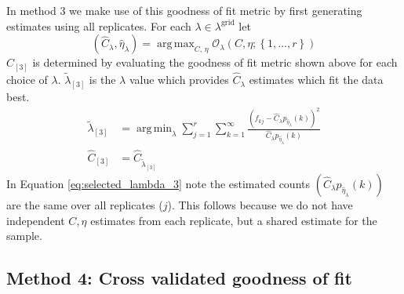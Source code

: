 \documentclass[oupdraft]{bio}
\DeclareMathOperator*{\argmin}{arg\,min}
\DeclareMathOperator*{\argmax}{arg\,max}
\newcommand{\lambdagrid}{\lambda^{\text{grid}}}
\begin{document}
In method 3 we make use of this goodness of fit metric by first generating estimates using all replicates.  For each $\lambda \in \lambdagrid$ let
\begin{equation}
\left(\widehat{C}_{\lambda}, \widehat{\eta}_{\lambda} \right) = \argmax_{C, \, \eta} \mathcal{O}_\lambda \left(C, \eta; \left\{1, \dots, r \right\} \right) \label{eq:c_hat_lambdas_method_3}
\end{equation}
$\widehat{C}_{[3]}$ is determined by evaluating the goodness of fit metric shown above for each choice of $\lambda$.  $\widetilde{\lambda}_{[3]}$ is the $\lambda$ value which provides $\widehat{C}_{\lambda}$ estimates which fit the data best.
\begin{align}
\widetilde{\lambda}_{[3]} &= \argmin_{\lambda} \sum_{j=1}^r \sum_{k=1}^{\infty} \frac{ \left( f_{kj} - \widehat{C}_{\lambda} p_{\widehat{\eta}_{\lambda}}(k) \right)^2}{\widehat{C}_{\lambda}p_{\widehat{\eta}_{\lambda}}(k)} \label{eq:selected_lambda_3} \\
\widehat{C}_{[3]} &= \widehat{C}_{\widetilde{\lambda}_{[3]}}
\end{align}
In Equation \ref{eq:selected_lambda_3} note the estimated counts $\left( \widehat{C}_{\lambda} p_{\widehat{\eta}_{\lambda}}(k) \right)$ are the same over all replicates ($j$).  This follows because we do not have independent $C, \eta$ estimates from each replicate, but a shared estimate for the sample.

%
%
%
\subsection{Method 4: Cross validated goodness of fit}
\end{document}
